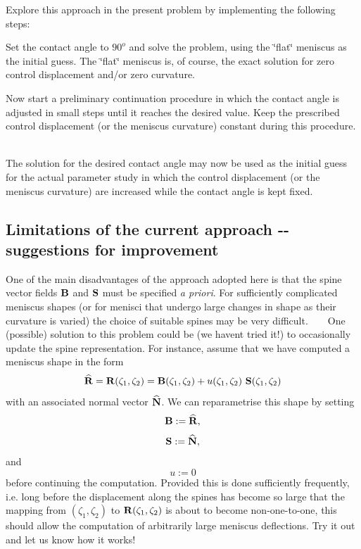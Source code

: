 Explore this approach in the present problem by implementing the following steps\+:
\begin{DoxyEnumerate}
\item Set the contact angle to $ 90^o $ and solve the problem, using the \char`\"{}flat\char`\"{} meniscus as the initial guess. The \char`\"{}flat\char`\"{} meniscus is, of course, the exact solution for zero control displacement and/or zero curvature. ~\newline
~\newline

\item Now start a preliminary continuation procedure in which the contact angle is adjusted in small steps until it reaches the desired value. Keep the prescribed control displacement (or the meniscus curvature) constant during this procedure. ~\newline
~\newline

\item The solution for the desired contact angle may now be used as the initial guess for the actual parameter study in which the control displacement (or the meniscus curvature) are increased while the contact angle is kept fixed.
\end{DoxyEnumerate}\hypertarget{index_lim}{}\subsection{Limitations of the current approach -\/-\/ suggestions for improvement}\label{index_lim}
One of the main disadvantages of the approach adopted here is that the spine vector fields $ {\bf B} $ and $ {\bf S} $ must be specified {\itshape a priori}. For sufficiently complicated meniscus shapes (or for menisci that undergo large changes in shape as their curvature is varied) the choice of suitable spines may be very difficult. ~\newline
~\newline
One (possible) solution to this problem could be (we haven\textquotesingle{}t tried it!) to occasionally update the spine representation. For instance, assume that we have computed a meniscus shape in the form ~\newline
~\newline
 \[ \widehat{\bf R} = {\bf R}(\zeta_1,\zeta_2) = {\bf B}(\zeta_1,\zeta_2) + u(\zeta_1,\zeta_2) \ {\bf S}(\zeta_1,\zeta_2) \] with an associated normal vector $ \widehat{\bf N} $. We can reparametrise this shape by setting \[ {\bf B} := \widehat{\bf R}, \] \[ {\bf S} := \widehat{\bf N}, \] and \[ u := 0 \] before continuing the computation. Provided this is done sufficiently frequently, i.\+e. long before the displacement along the spines has become so large that the mapping from $ (\zeta_1,\zeta_2) $ to $ {\bf R}(\zeta_1,\zeta_2)$ is about to become non-\/one-\/to-\/one, this should allow the computation of arbitrarily large meniscus deflections. Try it out and let us know how it works! ~\newline
